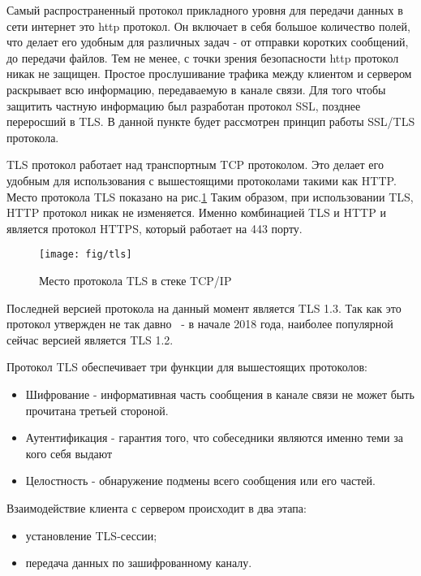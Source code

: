 Самый распространенный протокол прикладного уровня для передачи данных в сети интернет это http протокол. Он включает в себя большое количество полей, что делает его удобным для различных задач - от отправки коротких сообщений, до передачи файлов. Тем не менее, с точки зрения безопасности http протокол никак не защищен. Простое прослушивание трафика между клиентом и сервером раскрывает всю информацию, передаваемую в канале связи. Для того чтобы защитить частную информацию был разработан протокол SSL, позднее переросший в TLS. В данной пункте будет рассмотрен принцип работы SSL/TLS протокола. 

TLS протокол работает над транспортным TCP протоколом. Это делает его удобным для использования с вышестоящими протоколами такими как HTTP. Место протокола TLS показано на рис.\ref{fig:TLSinTCPIP} Таким образом, при использовании TLS, HTTP протокол никак не изменяется. Именно комбинацией TLS и HTTP и является протокол HTTPS, который работает на 443 порту.

\begin{figure}[H]
	\centering
	\texttt{[image: fig/tls]}
	\caption{Место протокола TLS в стеке TCP/IP}
	\label{fig:TLSinTCPIP}
\end{figure}

Последней версией протокола на данный момент является TLS 1.3. Так как это протокол утвержден не так давно~\cite{Kinsta} -  в начале 2018 года, наиболее популярной сейчас версией является TLS 1.2.

Протокол TLS обеспечивает три функции для вышестоящих протоколов:

\begin{itemize}
	\item Шифрование - информативная часть сообщения в канале связи не может быть прочитана третьей стороной.
	\item Аутентификация - гарантия того, что собеседники являются именно теми за кого себя выдают
	\item Целостность - обнаружение подмены всего сообщения или его частей.
\end{itemize}

Взаимодействие клиента с сервером происходит в два этапа:

\begin{itemize}
	\item установление TLS-сессии;
	\item передача данных по зашифрованному каналу.
\end{itemize}

